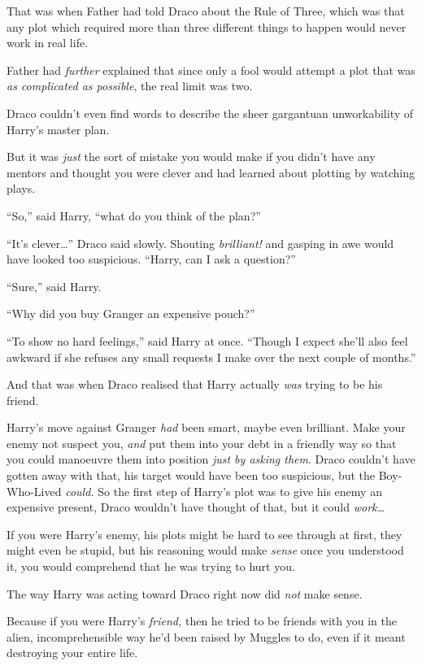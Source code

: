 That was when Father had told Draco about the Rule of Three, which was
that any plot which required more than three different things to happen
would never work in real life.

Father had \emph{further} explained that since only a fool would attempt
a plot that was \emph{as complicated as possible}, the real limit was
two.

Draco couldn't even find words to describe the sheer gargantuan
unworkability of Harry's master plan.

But it was \emph{just} the sort of mistake you would make if you didn't
have any mentors and thought you were clever and had learned about
plotting by watching plays.

``So,'' said Harry, ``what do you think of the plan?''

``It's clever\ldots{}'' Draco said slowly. Shouting \emph{brilliant!}
and gasping in awe would have looked too suspicious. ``Harry, can I ask
a question?''

``Sure,'' said Harry.

``Why did you buy Granger an expensive pouch?''

``To show no hard feelings,'' said Harry at once. ``Though I expect
she'll also feel awkward if she refuses any small requests I make over
the next couple of months.''

And that was when Draco realised that Harry actually \emph{was} trying
to be his friend.

Harry's move against Granger \emph{had} been smart, maybe even
brilliant. Make your enemy not suspect you, \emph{and} put them into
your debt in a friendly way so that you could manoeuvre them into
position \emph{just by asking them}. Draco couldn't have gotten away
with that, his target would have been too suspicious, but the
Boy-Who-Lived \emph{could.} So the first step of Harry's plot was to
give his enemy an expensive present, Draco wouldn't have thought of
that, but it could \emph{work\ldots{}}

If you were Harry's enemy, his plots might be hard to see through at
first, they might even be stupid, but his reasoning would make
\emph{sense} once you understood it, you would comprehend that he was
trying to hurt you.

The way Harry was acting toward Draco right now did \emph{not} make
sense.

Because if you were Harry's \emph{friend,} then he tried to be friends
with you in the alien, incomprehensible way he'd been raised by Muggles
to do, even if it meant destroying your entire life.


